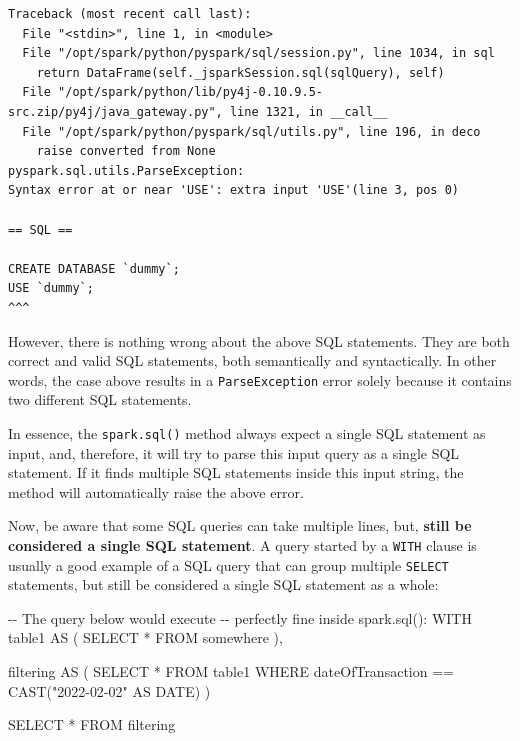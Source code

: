 \documentclass[
  11pt,
  letterpaper,
  DIV=11,
  numbers=noendperiod]{scrreprt}
\newenvironment{Shaded}{\begin{snugshade}}{\end{snugshade}}
\newcommand{\CommentTok}[1]{\textcolor[rgb]{0.37,0.37,0.37}{#1}}
\newcommand{\DataTypeTok}[1]{\textcolor[rgb]{0.68,0.00,0.00}{#1}}
\newcommand{\FunctionTok}[1]{\textcolor[rgb]{0.28,0.35,0.67}{#1}}
\newcommand{\KeywordTok}[1]{\textcolor[rgb]{0.00,0.23,0.31}{#1}}
\newcommand{\NormalTok}[1]{\textcolor[rgb]{0.00,0.23,0.31}{#1}}
\newcommand{\OperatorTok}[1]{\textcolor[rgb]{0.37,0.37,0.37}{#1}}
\newcommand{\OtherTok}[1]{\textcolor[rgb]{0.00,0.23,0.31}{#1}}
\begin{document}
\begin{verbatim}
Traceback (most recent call last):
  File "<stdin>", line 1, in <module>
  File "/opt/spark/python/pyspark/sql/session.py", line 1034, in sql
    return DataFrame(self._jsparkSession.sql(sqlQuery), self)
  File "/opt/spark/python/lib/py4j-0.10.9.5-src.zip/py4j/java_gateway.py", line 1321, in __call__
  File "/opt/spark/python/pyspark/sql/utils.py", line 196, in deco
    raise converted from None
pyspark.sql.utils.ParseException: 
Syntax error at or near 'USE': extra input 'USE'(line 3, pos 0)

== SQL ==

CREATE DATABASE `dummy`;
USE `dummy`;
^^^
\end{verbatim}

However, there is nothing wrong about the above SQL statements. They are
both correct and valid SQL statements, both semantically and
syntactically. In other words, the case above results in a
\texttt{ParseException} error solely because it contains two different
SQL statements.

In essence, the \texttt{spark.sql()} method always expect a single SQL
statement as input, and, therefore, it will try to parse this input
query as a single SQL statement. If it finds multiple SQL statements
inside this input string, the method will automatically raise the above
error.

Now, be aware that some SQL queries can take multiple lines, but,
\textbf{still be considered a single SQL statement}. A query started by
a \texttt{WITH} clause is usually a good example of a SQL query that can
group multiple \texttt{SELECT} statements, but still be considered a
single SQL statement as a whole:

\begin{Shaded}
\begin{Highlighting}[]
\CommentTok{{-}{-} The query below would execute}
\CommentTok{{-}{-} perfectly fine inside spark.sql():}
\KeywordTok{WITH}\NormalTok{ table1 }\KeywordTok{AS}\NormalTok{ (}
  \KeywordTok{SELECT} \OperatorTok{*}
  \KeywordTok{FROM}\NormalTok{ somewhere}
\NormalTok{),}

\NormalTok{filtering }\KeywordTok{AS}\NormalTok{ (}
  \KeywordTok{SELECT} \OperatorTok{*}
  \KeywordTok{FROM}\NormalTok{ table1}
  \KeywordTok{WHERE}\NormalTok{ dateOfTransaction }\OperatorTok{==} \FunctionTok{CAST}\NormalTok{(}\OtherTok{"2022{-}02{-}02"} \KeywordTok{AS} \DataTypeTok{DATE}\NormalTok{)}
\NormalTok{)}

\KeywordTok{SELECT} \OperatorTok{*}
\KeywordTok{FROM}\NormalTok{ filtering}
\end{Highlighting}
\end{Shaded}
\end{document}
